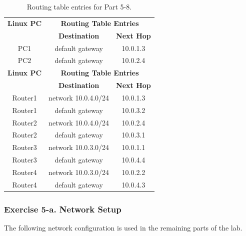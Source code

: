 \begin{table}[ht]
	\centering
	\begin{tabular}{ |c | c c |}
		\hline
		\textbf{Linux PC} & \multicolumn{2}{c|}{\textbf{Routing Table Entries}} \\
		 & \textbf{Destination} & \textbf{Next Hop} \\ \hline
		PC1 & default gateway & 10.0.1.3 \\ \hline
		PC2 & default gateway & 10.0.2.4 \\ \hline
		\textbf{Linux PC} & \multicolumn{2}{c|}{\textbf{Routing Table Entries}} \\
		 & \textbf{Destination} & \textbf{Next Hop} \\ \hline
		Router1 & network 10.0.4.0/24 & 10.0.1.3 \\ 
		Router1 & default gateway & 10.0.3.2 \\ \hline
		Router2 & network 10.0.4.0/24 & 10.0.2.4 \\ 
		Router2 & default gateway & 10.0.3.1 \\ \hline
		Router3 & network 10.0.3.0/24 & 10.0.1.1 \\ 
		Router3 & default gateway & 10.0.4.4 \\ \hline
		Router4 & network 10.0.3.0/24 & 10.0.2.2 \\ 
		Router4 & default gateway & 10.0.4.3 \\ \hline
	\end{tabular}
	\caption{Routing table entries for Part 5-8.}
	\label{tab:lab5-routing-entries-part5-8}
\end{table}

\subsubsection{Exercise 5-a. Network Setup}

The following network configuration is used in the remaining parts of the lab.

